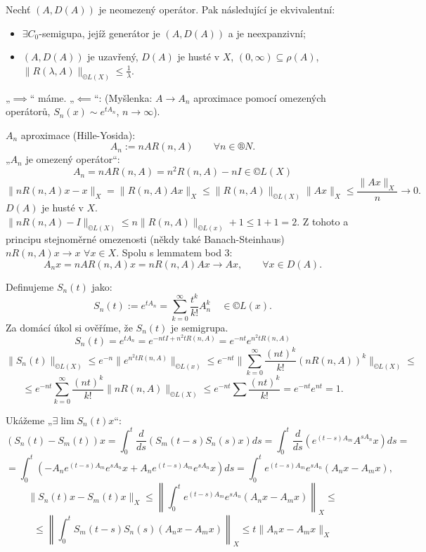 \documentclass[12pt]{article}					%
\begin{document}
\begin{veta}
	Nechť $(A, D(A))$ je neomezený operátor. Pak následující je ekvivalentní:

	\begin{itemize}
		\item $\exists C_0$-semigupa, jejíž generátor je $(A, D(A))$ a je neexpanzivní;
		\item $(A, D(A))$ je uzavřený, $D(A)$ je husté v $X$, $(0, ∞) \subseteq \rho(A)$, $\|R(\lambda, A)\|_{©L(X)} ≤ \frac{1}{\lambda}$.
	\end{itemize}

	\begin{dukazin}
		„$\implies$“ máme. „$\impliedby$“: (Myšlenka: $A \rightarrow A_n$ aproximace pomocí omezených operátorů, $S_n(x) \sim e^{t A_n}$, $n \rightarrow ∞$).
	\end{dukazin}
		
	\begin{dukazin}[Krok 1]
		$A_n$ aproximace (Hille-Yosida):
		$$ A_n := n A R(n, A) \qquad \forall n \in ®N. $$
		„$A_n$ je omezený operátor“:
		$$ A_n = n A R(n, A) = n^2 R(n, A) - n I \in ©L(X) $$
		$$ \|n R(n, A) x - x\|_X = \|R(n, A) A x\|_X ≤ \|R(n, A)\|_{©L(X)} \|A x\|_X ≤ \frac{\|A x\|_X}{n} \rightarrow 0. $$
		$D(A)$ je husté v $X$. $\|n R(n, A) - I\|_{©L(X)} ≤ n \|R(n, A)\|_{©L(x)} + 1 ≤ 1 + 1 = 2$. Z tohoto a principu stejnoměrné omezenosti (někdy také Banach-Steinhaus) $nR(n, A) x \rightarrow x$ $\forall x \in X$. Spolu s lemmatem bod 3:
		$$ A_n x = n A R(n, A)x = n R(n, A) A x \rightarrow A x, \qquad \forall x \in D(A). $$
	\end{dukazin}

	\begin{dukazin}[Krok 2]
		Definujeme $S_n(t)$ jako:
		$$ S_n(t) := e^{t A_n} = \sum_{k=0}^∞ \frac{t^k}{k!} A_n^k \quad \in ©L(x). $$
		Za domácí úkol si ověříme, že $S_n(t)$ je semigrupa.
		$$ S_n(t) = e^{t A_n} = e^{-n t I + n^2 t R(n, A)} = e^{-n t} e^{n^2 t R(n, A)} $$
		$$ \|S_n(t)\|_{©L(X)} ≤ e^{-n} \|e^{n^2 t R(n, A)}\|_{©L(x)} ≤ e^{-n t} \|\sum_{k=0}^∞ \frac{(n t)^k}{k!} (n R(n, A))^k\|_{©L(X)} ≤ $$
		$$ ≤ e^{-n t} \sum_{k=0}^∞ \frac{(n t)^k}{k!} \|n R(n, A)\|_{©L(X)} ≤ e^{-n t} \sum \frac{(n t)^k}{k!} = e^{-n t} e^{n t} = 1. $$
	\end{dukazin}

	\begin{dukazin}[Krok 3]
		Ukážeme „$\exists \lim S_n(t) x$“:
		$$ (S_n (t) - S_m (t))x = \int_0^t \frac{d}{ds} (S_m(t - s) S_n(s) x) ds = \int_0^t \frac{d}{ds} (e^{(t - s) A_m} A^{s A_n} x) ds = $$
		$$ = \int_0^t (- A_n e^{(t - s) A_m} e^{s A_n} x + A_n e^{(t - s) A_m}e^{s A_n} x) ds = \int_0^t e^{(t - s) A_m} e^{s A_n}(A_n x - A_m x), $$
		$$ \|S_n(t) x - S_m(t) x \|_X ≤ \left\|\int_0^t e^{(t - s) A_m} e^{s A_n}(A_n x - A_m x)\right\|_X ≤ $$
		$$ ≤ \left\|\int_0^t S_m(t - s)S_n(s)(A_n x - A_m x)\right\|_X ≤ t \|A_n x - A_m x\|_X $$


\end{dukazin}
\end{veta}
\end{document}
